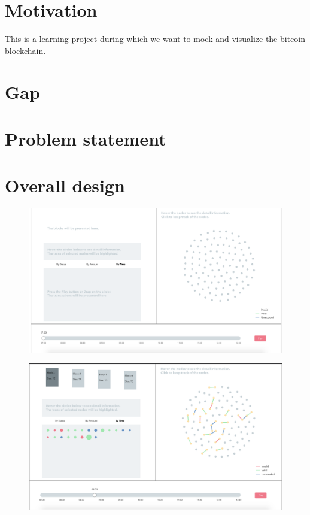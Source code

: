 \documentclass[journal, a4paper]{IEEEtran}
\begin{document}
\section{Motivation}
This is a learning project during which we want to mock and visualize the bitcoin blockchain.

\section{Gap}

\section{Problem statement}

\section{Overall design}

\begin{figure}[!hbt]
		\begin{center}
		\includegraphics[width=\columnwidth]{overall_design_start.png}
		\caption{}
		\label{fig:overall_design}
		\end{center}
	\end{figure}

\begin{figure}[!hbt]
		\begin{center}
		\includegraphics[width=\columnwidth]{overall_design.png}
		\caption{}
		\label{fig:overall_design}
		\end{center}
	\end{figure}
\end{document}
